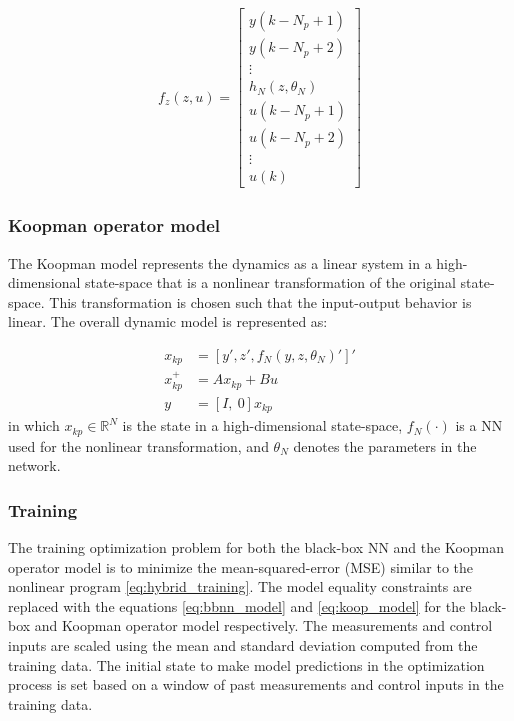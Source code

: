 \documentclass[10pt]{article}
\newcommand{\bbR}{\mathbb{R}} \newcommand{\bbW}{\mathbb{W}}
\begin{document}
\begin{align*}
  f_z(z, u) = \begin{bmatrix}
    y(k-N_p+1) \\
    y(k-N_p+2) \\
    \vdots \\
    h_N(z, \theta_N) \\
    u(k-N_p+1) \\ 
    u(k-N_p+2) \\
    \vdots \\
    u(k)
  \end{bmatrix}
\end{align*}

\subsubsection{Koopman operator model}

The Koopman model represents the dynamics as a linear system in a
high-dimensional state-space that is a nonlinear transformation of the original
state-space. This transformation is chosen such that the input-output behavior
is linear. The overall dynamic model is represented as:

\begin{align} \label{eq:koop_model}
  x_{kp} &= [y', z', f_N(y, z, \theta_N)']' \\
  x_{kp}^+ &= Ax_{kp} + Bu \nonumber \\
  y &= [I, \ 0] x_{kp} \nonumber
\end{align}
in which $x_{kp} \in \bbR^N$ is the state in a high-dimensional state-space,
$f_N(\cdot)$ is a NN used for the nonlinear transformation, and $\theta_N$
denotes the parameters in the network.

\subsubsection{Training}
The training optimization problem for both the black-box NN and the Koopman
operator model is to minimize the mean-squared-error (MSE) similar to the
nonlinear program \eqref{eq:hybrid_training}. The model equality constraints are
replaced with the equations \eqref{eq:bbnn_model} and \eqref{eq:koop_model} for
the black-box and Koopman operator model respectively. The measurements and
control inputs are scaled using the mean and standard deviation computed from
the training data. The initial state to make model predictions in the
optimization process is set based on a window of past measurements and control
inputs in the training data.
\end{document}
